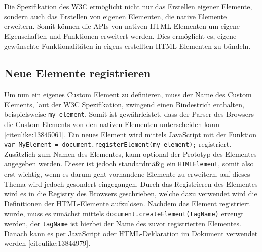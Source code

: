 \begin{Shaded}
\begin{Highlighting}[]
  \KeywordTok{>}
\KeywordTok{>}
\end{Highlighting}
\end{Shaded}

Die Spezifikation des W3C ermöglicht nicht nur das Erstellen eigener
Elemente, sondern auch das Erstellen von eigenen Elementen, die native
Elemente erweitern. Somit können die APIs von nativen HTML Elementen um
eigene Eigenschaften und Funktionen erweitert werden. Dies ermöglicht
es, eigene gewünschte Funktionalitäten in eigens erstellten HTML
Elementen zu bündeln.

\subsection{Neue Elemente
registrieren}\label{neue-elemente-registrieren}

Um nun ein eigenes Custom Element zu definieren, muss der Name des
Custom Elements, laut der W3C Spezifikation, zwingend einen Bindestrich
enthalten, beispielsweise \texttt{my-element}. Somit ist gewährleistet,
dass der Parser des Browsers die Custom Elements von den nativen
Elementen unterscheiden kann {[}citeulike:13845061{]}. Ein neues Element
wird mittels JavaScript mit der Funktion
\texttt{var\ MyElement\ =\ document.registerElement(\textquotesingle{}my-element\textquotesingle{});}
registriert. Zusätzlich zum Namen des Elementes, kann optional der
Prototyp des Elementes angegeben werden. Dieser ist jedoch standardmäßig
ein \texttt{HTMLElement}, somit also erst wichtig, wenn es darum geht
vorhandene Elemente zu erweitern, auf dieses Thema wird jedoch gesondert
eingegangen. Durch das Registrieren des Elementes wird es in die
Registry des Browsers geschrieben, welche dazu verwendet wird die
Definitionen der HTML-Elemente aufzulösen. Nachdem das Element
registriert wurde, muss es zunächst mittels
\texttt{document.createElement(tagName)} erzeugt werden, der
\texttt{tagName} ist hierbei der Name des zuvor registrierten Elementes.
Danach kann es per JavaScript oder HTML-Deklaration im Dokument
verwendet werden {[}citeulike:13844979{]}.


